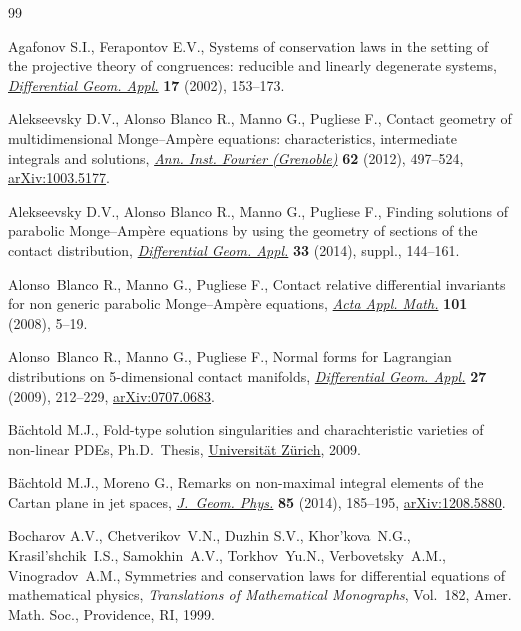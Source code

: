 \documentclass[pdftex]{sigma}
\numberwithin{equation}{section}
\begin{document}
\begin{thebibliography}{99}
\footnotesize\itemsep=-0.8pt

Agafonov S.I., Ferapontov E.V., Systems of conservation laws in the setting of
 the projective theory of congruences: reducible and linearly degenerate
 systems, \href{http://dx.doi.org/10.1016/S0926-2245(02)00105-5}{\textit{Differential Geom. Appl.}} \textbf{17} (2002), 153--173.

Alekseevsky D.V., Alonso Blanco R., Manno G., Pugliese F., Contact geometry of
 multidimensional {M}onge--{A}mp\`ere equations: characteristics, intermediate
 integrals and solutions, \href{http://dx.doi.org/10.5802/aif.2686}{\textit{Ann. Inst. Fourier (Grenoble)}} \textbf{62}
 (2012), 497--524, \href{http://arxiv.org/abs/1003.5177}{arXiv:1003.5177}.

Alekseevsky D.V., Alonso Blanco R., Manno G., Pugliese F., Finding solutions of
 parabolic {M}onge--{A}mp\`ere equations by using the geometry of sections of
 the contact distribution, \href{http://dx.doi.org/10.1016/j.difgeo.2013.10.015}{\textit{Differential Geom. Appl.}} \textbf{33}
 (2014), suppl., 144--161.

Alonso~Blanco R., Manno G., Pugliese F., Contact relative dif\/ferential
 invariants for non generic parabolic {M}onge--{A}mp\`ere equations,
 \href{http://dx.doi.org/10.1007/s10440-008-9204-8}{\textit{Acta Appl. Math.}} \textbf{101} (2008), 5--19.

Alonso~Blanco R., Manno G., Pugliese F., Normal forms for {L}agrangian
 distributions on 5-dimensional contact manifolds, \href{http://dx.doi.org/10.1016/j.difgeo.2008.06.019}{\textit{Differential Geom.
 Appl.}} \textbf{27} (2009), 212--229, \href{http://arxiv.org/abs/0707.0683}{arXiv:0707.0683}.

B{\"a}chtold M.J., Fold-type solution singularities and charachteristic
 varieties of non-linear PDEs, Ph.D.~Thesis, \href{http://dx.doi.org/10.5167/uzh-42719}{Universit\"at Z\"urich}, 2009.

B{\"a}chtold M.J., Moreno G., Remarks on non-maximal integral elements of the
 {C}artan plane in jet spaces, \href{http://dx.doi.org/10.1016/j.geomphys.2014.05.006}{\textit{J.~Geom. Phys.}} \textbf{85} (2014),
 185--195, \href{http://arxiv.org/abs/1208.5880}{arXiv:1208.5880}.

Bocharov A.V., Chetverikov~V.N., Duzhin S.V., Khor'kova~N.G., Krasil'shchik~I.S., Samokhin~A.V., Torkhov~Yu.N., Verbovetsky~A.M., Vinogradov~A.M.,
 Symmetries and conservation laws for dif\/ferential equations of mathematical
 physics, \textit{Translations of Mathematical Monographs}, Vol.~182, Amer.
 Math. Soc., Providence, RI, 1999.


\end{thebibliography}
\end{document}
